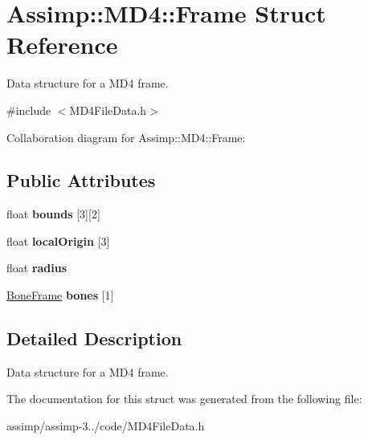\hypertarget{struct_assimp_1_1_m_d4_1_1_frame}{\section{Assimp\+:\+:M\+D4\+:\+:Frame Struct Reference}
\label{struct_assimp_1_1_m_d4_1_1_frame}
}


Data structure for a M\+D4 frame.  




{\ttfamily \#include $<$M\+D4\+File\+Data.\+h$>$}



Collaboration diagram for Assimp\+:\+:M\+D4\+:\+:Frame\+:
\subsection*{Public Attributes}
\begin{DoxyCompactItemize}
\item 
\hypertarget{struct_assimp_1_1_m_d4_1_1_frame_a50aadc7981b62a9099153be8fe034924}{float {\bfseries bounds} \mbox{[}3\mbox{]}\mbox{[}2\mbox{]}}\label{struct_assimp_1_1_m_d4_1_1_frame_a50aadc7981b62a9099153be8fe034924}

\item 
\hypertarget{struct_assimp_1_1_m_d4_1_1_frame_a27141b870cac51e6295c45867337d168}{float {\bfseries local\+Origin} \mbox{[}3\mbox{]}}\label{struct_assimp_1_1_m_d4_1_1_frame_a27141b870cac51e6295c45867337d168}

\item 
\hypertarget{struct_assimp_1_1_m_d4_1_1_frame_a0693fefe97d4b10361b9d6e2b2c0a30c}{float {\bfseries radius}}\label{struct_assimp_1_1_m_d4_1_1_frame_a0693fefe97d4b10361b9d6e2b2c0a30c}

\item 
\hypertarget{struct_assimp_1_1_m_d4_1_1_frame_a36cc71458583a3b28d7b45ef0aac87eb}{\hyperlink{struct_assimp_1_1_m_d4_1_1_bone_frame}{Bone\+Frame} {\bfseries bones} \mbox{[}1\mbox{]}}\label{struct_assimp_1_1_m_d4_1_1_frame_a36cc71458583a3b28d7b45ef0aac87eb}

\end{DoxyCompactItemize}


\subsection{Detailed Description}
Data structure for a M\+D4 frame. 

The documentation for this struct was generated from the following file\+:\begin{DoxyCompactItemize}
\item 
assimp/assimp-\/3../code/M\+D4\+File\+Data.\+h\end{DoxyCompactItemize}
